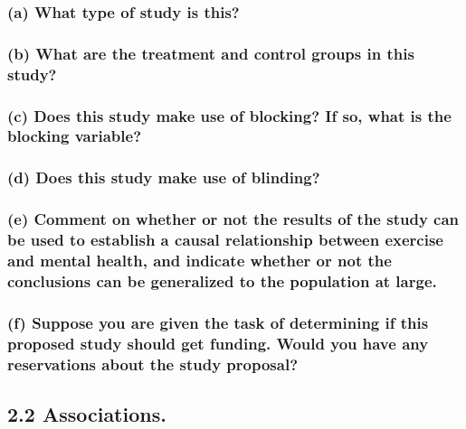 \documentclass[
]{article}
\begin{document}
\subsubsection{(a) What type of study is
this?}\label{a-what-type-of-study-is-this-1}

\subsubsection{(b) What are the treatment and control groups in this
study?}\label{b-what-are-the-treatment-and-control-groups-in-this-study}

\subsubsection{(c) Does this study make use of blocking? If so, what is
the blocking
variable?}\label{c-does-this-study-make-use-of-blocking-if-so-what-is-the-blocking-variable}

\subsubsection{(d) Does this study make use of
blinding?}\label{d-does-this-study-make-use-of-blinding}

\subsubsection{(e) Comment on whether or not the results of the study
can be used to establish a causal relationship between exercise and
mental health, and indicate whether or not the conclusions can be
generalized to the population at
large.}\label{e-comment-on-whether-or-not-the-results-of-the-study-can-be-used-to-establish-a-causal-relationship-between-exercise-and-mental-health-and-indicate-whether-or-not-the-conclusions-can-be-generalized-to-the-population-at-large.}

\subsubsection{(f) Suppose you are given the task of determining if this
proposed study should get funding. Would you have any reservations about
the study
proposal?}\label{f-suppose-you-are-given-the-task-of-determining-if-this-proposed-study-should-get-funding.-would-you-have-any-reservations-about-the-study-proposal}

\subsection{2.2 Associations.}\label{associations.}
\end{document}
